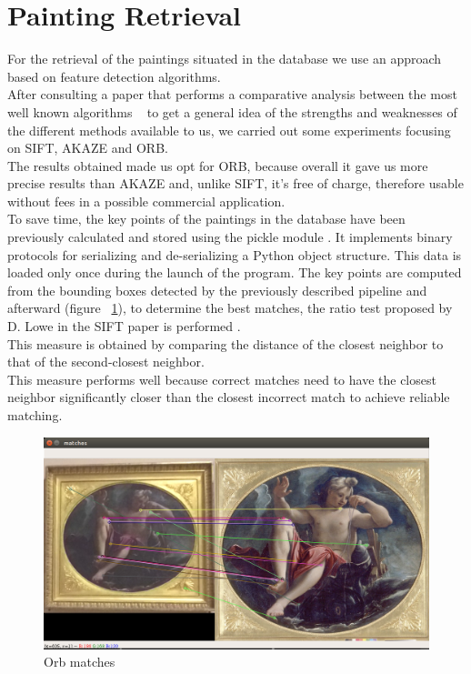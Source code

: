\documentclass[conference]{IEEEtran}
\begin{document}
\section{Painting Retrieval}
For the retrieval of the paintings situated in the database we use an approach based on feature detection algorithms.\\ 
After consulting a paper that performs a comparative analysis between the most well known algorithms ~\cite{b7} to get a general idea of the strengths and weaknesses of the different methods available to us, we carried out some experiments focusing on SIFT, AKAZE and ORB.\\
The results obtained made us opt for ORB, because overall it gave us more precise results than AKAZE and, unlike SIFT, it’s free of charge, therefore usable without fees in a possible commercial application.\\
To save time, the key points of the paintings in the database have been previously calculated and stored using the pickle module \cite{b8}.
It implements binary protocols for serializing and de-serializing a Python object structure.
This data is loaded only once during the launch of the program.
The key points are computed from the bounding boxes detected by the previously described pipeline and afterward (figure ~\ref{fig_Orb_matches}), to determine the best matches, the ratio test proposed by D. Lowe in the SIFT paper is performed \cite{b9}.\\
This measure is obtained by comparing the distance of the closest neighbor to that of the second-closest neighbor.\\
This measure performs well because correct matches need to have the closest neighbor significantly closer than the closest incorrect match to achieve reliable matching.\\

\begin{figure}[htbp]
\centerline{\includegraphics[width=0.8\columnwidth]{../Orb_matches/match3.png}}
\caption{Orb matches}
\label{fig_Orb_matches}
\end{figure}
\bigskip
\end{document}
